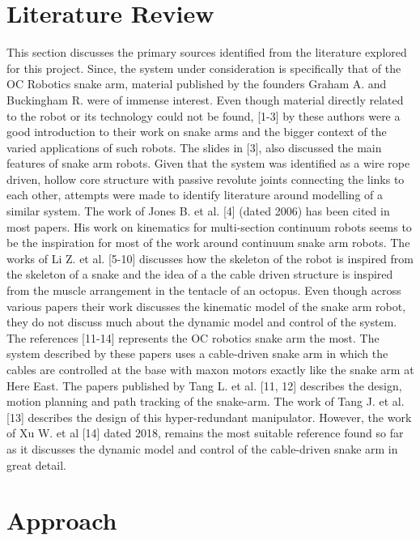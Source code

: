\documentclass[a4paper,12pt]{report}
\begin{document}
\section{Literature Review}
This section discusses the primary sources identified from the literature explored for this project.
Since, the system under consideration is specifically that of the OC Robotics snake arm, material published by the founders Graham A. and Buckingham R. were of immense interest. Even though material directly related to the robot or its technology could not be found, [1-3] by these authors were a good introduction to their work on snake arms and the bigger context of the  varied applications of such robots. The slides in [3], also discussed the main features of  snake arm robots.
Given that the system was identified as a wire rope driven, hollow core structure with passive revolute joints connecting the links to each other, attempts were made to identify literature around modelling of a similar system. The work of Jones B. et al. [4] (dated 2006) has been cited in most papers. His work on kinematics for multi-section continuum robots seems to be the inspiration for most of the work around continuum snake arm robots. The works of Li Z. et al. [5-10] discusses how the skeleton of the robot is inspired from the skeleton of a snake and the idea of a the cable driven structure is inspired from the muscle arrangement in the tentacle of an octopus. Even though across various papers their work discusses the kinematic model of the snake arm robot, they do not discuss much about the dynamic model and control of the system. The references [11-14] represents the OC robotics snake arm the most. The system described by these papers uses a cable-driven snake arm in which the cables are controlled at the base with maxon motors exactly like the snake arm at Here East. The papers published by Tang L. et al. [11, 12] describes the design, motion planning and path tracking of the snake-arm. The work of Tang J. et al. [13] describes the design of this hyper-redundant manipulator. However, the work of Xu W. et al [14] dated 2018, remains the most suitable reference found so far as it discusses the dynamic model and control of the cable-driven snake arm in great detail. 

\section{Approach}%
\end{document}
